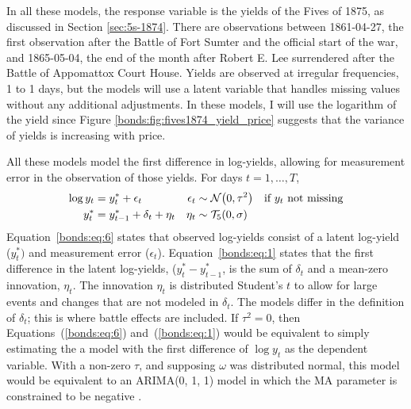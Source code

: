 In all these models, the response variable is the yields of the Fives of 1875, as discussed in Section \ref{sec:5s-1874}.
There are  observations between 1861-04-27, the first observation after the Battle of Fort Sumter and the official start of the war, and 1865-05-04, the end of the month after Robert E. Lee surrendered after the Battle of Appomattox Court House.
Yields are observed at irregular frequencies, 1 to 1 days, but the models will use a latent variable that handles missing values without any additional adjustments.
In these models, I will use the logarithm of the yield since Figure \ref{bonds:fig:fives1874_yield_price} suggests that the variance of yields is increasing with price.

All these models model the first difference in log-yields, allowing for measurement error in the observation of those yields.
For days $t = 1, \dots, T$,
\begin{align}
  \label{bonds:eq:6}
  \log y_{t} &= y^{*}_{t} + \epsilon_{t} & \epsilon_{t} &\sim \mathcal{N}\mathopen{}\left(0, \tau^{2}\right)\mathclose{} & \text{if $y_t$ not missing} \\
  \label{bonds:eq:1}
  y^{*}_{t} &= y^{*}_{t - 1} + \delta_{t} + \eta_{t} & \eta_{t} &\sim \mathcal{T}_{5}\mathopen{}\left(0, \sigma\right)\mathclose{}
\end{align}
Equation~\eqref{bonds:eq:6} states that observed log-yields consist of a latent log-yield ($y^{*}_{t})$ and measurement error ($\epsilon_{t}$).
Equation~\eqref{bonds:eq:1} states that the first difference in the latent log-yields, ($y^{*}_{t} - y^{*}_{t-1}$, is the sum of $\delta_{t}$ and a mean-zero innovation, $\eta_{t}$.
The innovation $\eta_{t}$ is distributed Student's $t$ to allow for large events and changes that are not modeled in $\delta_{t}$.
The models differ in the definition of $\delta_{t}$; this is where battle effects are included.
If $\tau^{2} = 0$, then Equations~(\ref{bonds:eq:6}) and~(\ref{bonds:eq:1}) would be equivalent to simply estimating the a model with the first difference of $\log y_{t}$ as the dependent variable.
With a non-zero $\tau$, and supposing $\omega$ was distributed normal, this model would be equivalent to an ARIMA(0, 1, 1) model in which the MA parameter is constrained to be negative \parencite[91]{PetrisPetroneEtAl2009}.

